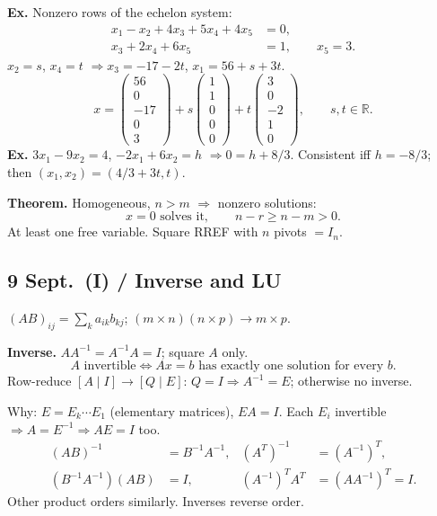 \documentclass[11pt,letterpaper]{article}
\begin{document}
\textbf{Ex.} Nonzero rows of the echelon system: \[
\begin{aligned}
x_1-x_2+4x_3+5x_4+4x_5&=0,\\
x_3+2x_4+6x_5&=1,\qquad x_5=3.
\end{aligned}
\] \(x_2=s\), \(x_4=t\) \(\Rightarrow x_3=-17-2t\), \(x_1=56+s+3t\). \[
x=\begin{pmatrix}56\\0\\-17\\0\\3\end{pmatrix}
+s\begin{pmatrix}1\\1\\0\\0\\0\end{pmatrix}
+t\begin{pmatrix}3\\0\\-2\\1\\0\end{pmatrix},\qquad s,t\in\mathbb R.
\] \textbf{Ex.} \(3x_1-9x_2=4\), \(-2x_1+6x_2=h\)
\(\Rightarrow 0=h+8/3\). Consistent iff \(h=-8/3\); then
\((x_1,x_2)=(4/3+3t,t)\).

\textbf{Theorem.} Homogeneous, \(n>m\) \(\Rightarrow\) nonzero
solutions: \[
x=0\text{ solves it},\qquad n-r\ge n-m>0.
\] At least one free variable. Square RREF with \(n\) pivots \(=I_n\).

\newpage

\subsection{9 Sept.~(I) / Inverse and LU}\label{sept.-i-inverse-and-lu}

\((AB)_{ij}=\sum_k a_{ik}b_{kj}\);
\((m\times n)(n\times p)\to m\times p\).

\textbf{Inverse.} \(AA^{-1}=A^{-1}A=I\); square \(A\) only. \[
A\text{ invertible}\iff Ax=b\text{ has exactly one solution for every }b.
\] Row-reduce \([A\mid I]\to[Q\mid E]\): \(Q=I\Rightarrow A^{-1}=E\);
otherwise no inverse.

Why: \(E=E_k\cdots E_1\) (elementary matrices), \(EA=I\). Each \(E_i\)
invertible \(\Rightarrow A=E^{-1}\Rightarrow AE=I\) too. \[
\begin{aligned}
(AB)^{-1}&=B^{-1}A^{-1},&(A^T)^{-1}&=(A^{-1})^T,\\
(B^{-1}A^{-1})(AB)&=I,&(A^{-1})^TA^T&=(AA^{-1})^T=I.
\end{aligned}
\] Other product orders similarly. Inverses reverse order.
\end{document}
